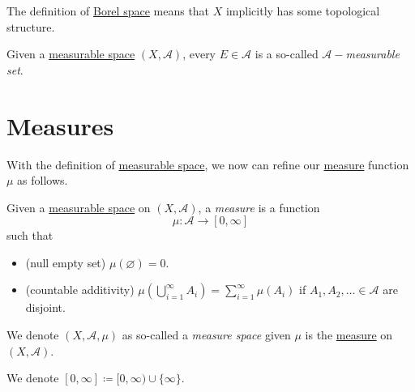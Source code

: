 \begin{remark}
	The definition of \hyperref[def:Borel-space]{Borel space} means that \(X\) implicitly has some topological structure.
\end{remark}

\begin{definition}\label{def:measurable-set}
	Given a \hyperref[def:measurable-space]{measurable space} \((X, \mathcal{A} )\), every \(E\in \mathcal{A} \) is a so-called \emph{\(\mathcal{A}-\)measurable set}.
\end{definition}

\section{Measures}
With the definition of \hyperref[def:measurable-space]{measurable space}, we now can refine our \hyperref[def:measure]{measure} function \(\mu\) as follows.

\begin{definition}[Measure]\label{def:measure}
	Given a \hyperref[def:measurable-space]{measurable space} on \((X, \mathcal{A}) \), a \emph{measure} is a function
	\[
		\mu\colon \mathcal{A} \to [0, \infty]
	\]
	such that
	\begin{itemize}
		\item\label{def:measure-null-empty-set}(null empty set) \(\mu(\varnothing ) = 0\).
		\item\label{def:measure-countable-additivity}(countable additivity) \(\mu\left(\bigcup_{i=1}^{\infty} A_{i}\right) = \sum_{i=1}^{\infty}\mu(A_{i})\) if \(A_1, A_2, \dots \in \mathcal{A}\)
		      are disjoint.
	\end{itemize}
\end{definition}

\begin{definition}\label{def:measure-space}
	We denote \((X, \mathcal{A} , \mu)\) as so-called a \emph{measure space} given \(\mu\) is the \hyperref[def:measure]{measure} on \((X, \mathcal{A} )\).
\end{definition}

\begin{notation}
	We denote \([0, \infty] \coloneqq [0, \infty) \cup \{\infty\}\).
\end{notation}

